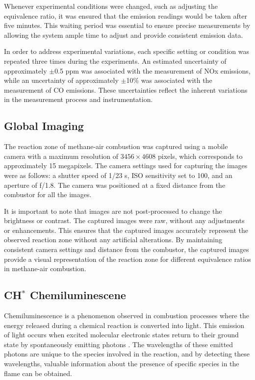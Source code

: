 Whenever experimental conditions were changed, such as adjusting the equivalence ratio, it was ensured that the emission readings would be taken after five minutes. This waiting period was essential to ensure precise measurements by allowing the system ample time to adjust and provide consistent emission data.

In order to address experimental variations, each specific setting or condition was repeated three times during the experiments. An estimated uncertainty of approximately $\pm$0.5 ppm was associated with the measurement of NOx emissions, while an uncertainty of approximately $\pm$10$\%$ was associated with the measurement of CO emissions. These uncertainties reflect the inherent variations in the measurement process and instrumentation.


\subsection{Global Imaging}
The reaction zone of methane-air combustion was captured using a mobile camera with a maximum resolution of $3456 \times 4608$ pixels, which corresponds to approximately 15 megapixels. The camera settings used for capturing the images were as follows: a shutter speed of 1/23 s, ISO sensitivity set to 100, and an aperture of f/1.8. The camera was positioned at a fixed distance from the combustor for all the images.

It is important to note that images are not post-processed to change the brightness or contrast. The captured images were raw, without any adjustments or enhancements. This ensures that the captured images accurately represent the observed reaction zone without any artificial alterations. By maintaining consistent camera settings and distance from the combustor, the captured images provide a visual representation of the reaction zone for different equivalence ratios in methane-air combustion.

\subsection{CH$^*$ Chemiluminescene}
Chemiluminescence is a phenomenon observed in combustion processes where the energy released during a chemical reaction is converted into light. This emission of light occurs when excited molecular electronic states return to their ground state by spontaneously emitting photons \cite{NORI2009895, TFVRMGBPJV2011}. The wavelengths of these emitted photons are unique to the species involved in the reaction, and by detecting these wavelengths, valuable information about the presence of specific species in the flame can be obtained.

